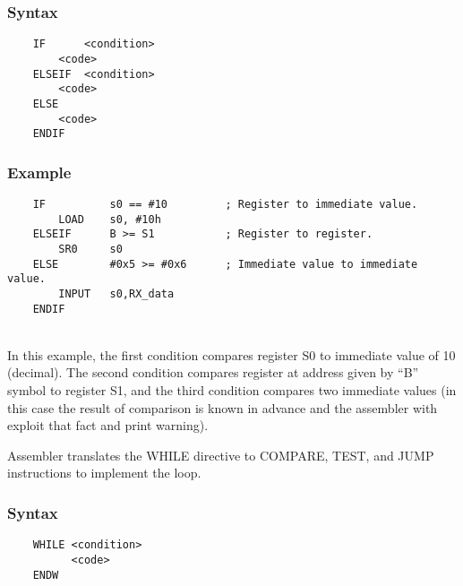         \subsubsection{Syntax}
            \verb'    IF      <condition>'\\
            \verb'        <code>'\\
            \verb'    ELSEIF  <condition>'\\
            \verb'        <code>'\\
            \verb'    ELSE'\\
            \verb'        <code>'\\
            \verb'    ENDIF'

        \subsubsection{Example}
            \verb'    IF          s0 == #10         ; Register to immediate value.'\\
            \verb'        LOAD    s0, #10h'\\
            \verb'    ELSEIF      B >= S1           ; Register to register.'\\
            \verb'        SR0     s0'\\
            \verb'    ELSE        #0x5 >= #0x6      ; Immediate value to immediate value.'\\
            \verb'        INPUT   s0,RX_data'\\
            \verb'    ENDIF'

            ~\\In this example, the first condition compares register S0 to immediate value of 10 (decimal). The second condition compares register at address given by ``B'' symbol to register S1, and the third condition compares two immediate values (in this case the result of comparison is known in advance and the assembler with exploit that fact and print warning).

        Assembler translates the WHILE directive to COMPARE, TEST, and JUMP instructions to implement the loop.

        \subsubsection{Syntax}
            \verb'    WHILE <condition>'\\
            \verb'          <code>'\\
            \verb'    ENDW'

